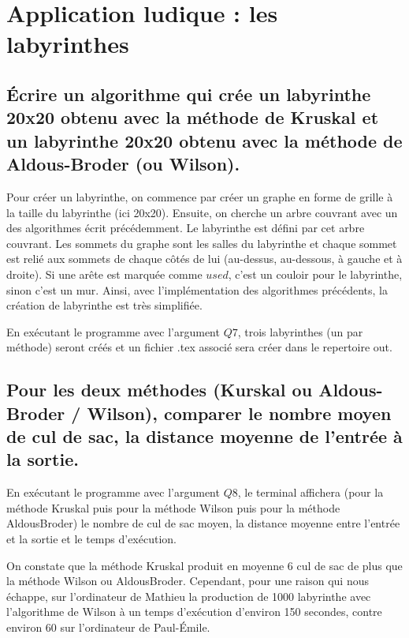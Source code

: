 \documentclass[a4paper,11pt]{article}
\begin{document}
    \section{Application ludique : les labyrinthes}\label{sec:labyrinthes}
        \subsection{Écrire un algorithme qui crée un labyrinthe 20x20 obtenu avec la méthode de Kruskal
        et un labyrinthe 20x20 obtenu avec la méthode de Aldous-Broder (ou Wilson).}\label{subsec:Q7.}
            Pour créer un labyrinthe, on commence par créer un graphe en forme de grille à la taille du labyrinthe (ici 20x20).
            Ensuite, on cherche un arbre couvrant avec un des algorithmes écrit précédemment.
            Le labyrinthe est défini par cet arbre couvrant.
            Les sommets du graphe sont les salles du labyrinthe et chaque sommet est relié aux sommets de chaque côtés de lui
            (au-dessus, au-dessous, à gauche et à droite).
            Si une arête est marquée comme $used$, c'est un couloir pour le labyrinthe, sinon c'est un mur.
            Ainsi, avec l'implémentation des algorithmes précédents, la création de labyrinthe est très simplifiée.

            En exécutant le programme avec l'argument $Q7$,
            trois labyrinthes (un par méthode) seront créés et un fichier .tex associé sera créer dans le repertoire out.

        \subsection{Pour les deux méthodes (Kurskal ou Aldous-Broder / Wilson),
        comparer le nombre moyen de cul de sac, la distance moyenne de l'entrée à la sortie.}\label{subsec:Q8}
            En exécutant le programme avec l'argument $Q8$,
            le terminal affichera (pour la méthode Kruskal puis pour la méthode Wilson puis pour la méthode AldousBroder)
            le nombre de cul de sac moyen, la distance moyenne entre l'entrée et la sortie et le temps d'exécution.

            On constate que la méthode Kruskal produit en moyenne 6 cul de sac de plus que la méthode Wilson ou AldousBroder.
            Cependant, pour une raison qui nous échappe, sur l'ordinateur de Mathieu
            la production de 1000 labyrinthe avec l'algorithme de Wilson à un temps d'exécution d'environ 150 secondes,
            contre environ 60 sur l'ordinateur de Paul-Émile.
\end{document}
